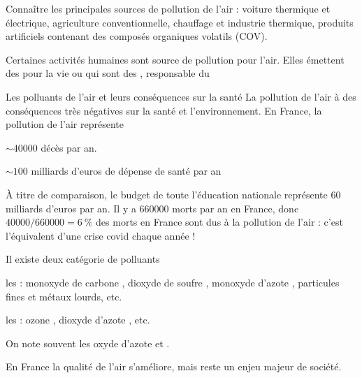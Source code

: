 \teteTermStssEnvi
{}

\begin{objectifs}
  \item Connaître les principales sources de pollution de l'air : voiture thermique et électrique, agriculture conventionnelle, chauffage et industrie thermique, produits artificiels contenant des composés organiques volatils (COV).
\end{objectifs}

\begin{contexte}
  Certaines activités humaines sont source de pollution pour l'air.
  Elles émettent des  pour la vie ou qui sont des , responsable du 
  
\end{contexte}


\begin{doc}{Les polluants de l'air et leurs conséquences sur la santé}
  La pollution de l'air à des conséquences très négatives sur la santé et l'environnement.
  En France, la pollution de l'air représente
  \begin{listePoints}
    \item $\sim \num{40000}$ décès par an.
    \item $\sim 100$ milliards d'euros de dépense de santé par an 
  \end{listePoints}
  À titre de comparaison, le budget de toute l'éducation nationale représente 60 milliards d'euros par an. 
  Il y a \num{660 000} morts par an en France, donc $\num{40000}/\num{660000} = \qty{6}{\percent}$ des morts en France sont dus à la pollution de l'air : c'est l'équivalent d'une crise covid chaque année !

  \begin{importants}
    Il existe deux catégorie de polluants
    \begin{listePoints}
      \item les  : monoxyde de carbone , dioxyde de soufre , monoxyde d'azote , particules fines et métaux lourds, etc.
      \item les  : ozone , dioxyde d'azote , etc.
    \end{listePoints}
    On note souvent  les oxyde d'azote  et .
  \end{importants}
  
  En France la qualité de l'air s'améliore, mais reste un enjeu majeur de société.

  \begin{center}
  \end{center}
\end{doc}


